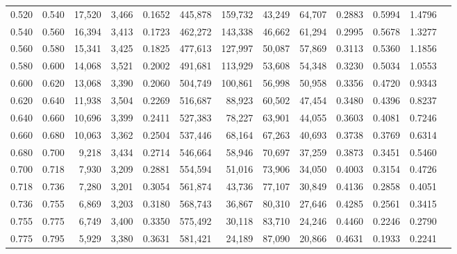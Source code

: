 \begin{tabular}{rrrrrrrrrrrrr}
0.520 & 0.540 & 17,520 & 3,466 &                                     0.1652 & 445,878 & 159,732 &  43,249 &  64,707 & 0.2883 & 0.5994 & 1.4796 \\
0.540 & 0.560 & 16,394 & 3,413 &                                     0.1723 & 462,272 & 143,338 &  46,662 &  61,294 & 0.2995 & 0.5678 & 1.3277 \\
0.560 & 0.580 & 15,341 & 3,425 &                                     0.1825 & 477,613 & 127,997 &  50,087 &  57,869 & 0.3113 & 0.5360 & 1.1856 \\
0.580 & 0.600 & 14,068 & 3,521 &                                     0.2002 & 491,681 & 113,929 &  53,608 &  54,348 & 0.3230 & 0.5034 & 1.0553 \\
0.600 & 0.620 & 13,068 & 3,390 &                                     0.2060 & 504,749 & 100,861 &  56,998 &  50,958 & 0.3356 & 0.4720 & 0.9343 \\
0.620 & 0.640 & 11,938 & 3,504 &                                     0.2269 & 516,687 &  88,923 &  60,502 &  47,454 & 0.3480 & 0.4396 & 0.8237 \\
0.640 & 0.660 & 10,696 & 3,399 &                                     0.2411 & 527,383 &  78,227 &  63,901 &  44,055 & 0.3603 & 0.4081 & 0.7246 \\
0.660 & 0.680 & 10,063 & 3,362 &                                     0.2504 & 537,446 &  68,164 &  67,263 &  40,693 & 0.3738 & 0.3769 & 0.6314 \\
0.680 & 0.700 &  9,218 & 3,434 &                                     0.2714 & 546,664 &  58,946 &  70,697 &  37,259 & 0.3873 & 0.3451 & 0.5460 \\
0.700 & 0.718 &  7,930 & 3,209 &                                     0.2881 & 554,594 &  51,016 &  73,906 &  34,050 & 0.4003 & 0.3154 & 0.4726 \\
0.718 & 0.736 &  7,280 & 3,201 &                                     0.3054 & 561,874 &  43,736 &  77,107 &  30,849 & 0.4136 & 0.2858 & 0.4051 \\
0.736 & 0.755 &  6,869 & 3,203 &                                     0.3180 & 568,743 &  36,867 &  80,310 &  27,646 & 0.4285 & 0.2561 & 0.3415 \\
0.755 & 0.775 &  6,749 & 3,400 &                                     0.3350 & 575,492 &  30,118 &  83,710 &  24,246 & 0.4460 & 0.2246 & 0.2790 \\
0.775 & 0.795 &  5,929 & 3,380 &                                     0.3631 & 581,421 &  24,189 &  87,090 &  20,866 & 0.4631 & 0.1933 & 0.2241 \\

\end{tabular}
